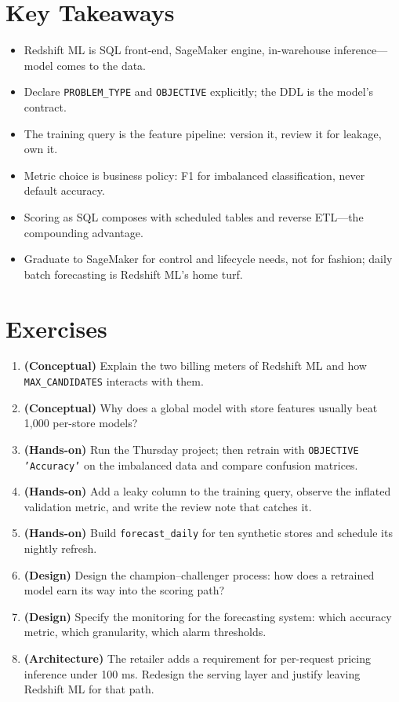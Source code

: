\section*{Key Takeaways}
\begin{itemize}
    \item Redshift ML is SQL front-end, SageMaker engine, in-warehouse inference---model comes to the data.
    \item Declare \texttt{PROBLEM\_TYPE} and \texttt{OBJECTIVE} explicitly; the DDL is the model's contract.
    \item The training query is the feature pipeline: version it, review it for leakage, own it.
    \item Metric choice is business policy: F1 for imbalanced classification, never default accuracy.
    \item Scoring as SQL composes with scheduled tables and reverse ETL---the compounding advantage.
    \item Graduate to SageMaker for control and lifecycle needs, not for fashion; daily batch forecasting is Redshift ML's home turf.
\end{itemize}

\section{Exercises}
\begin{enumerate}
    \item \textbf{(Conceptual)} Explain the two billing meters of Redshift ML and how \texttt{MAX\_CANDIDATES} interacts with them.
    \item \textbf{(Conceptual)} Why does a global model with store features usually beat 1,000 per-store models?
    \item \textbf{(Hands-on)} Run the Thursday project; then retrain with \texttt{OBJECTIVE 'Accuracy'} on the imbalanced data and compare confusion matrices.
    \item \textbf{(Hands-on)} Add a leaky column to the training query, observe the inflated validation metric, and write the review note that catches it.
    \item \textbf{(Hands-on)} Build \texttt{forecast\_daily} for ten synthetic stores and schedule its nightly refresh.
    \item \textbf{(Design)} Design the champion--challenger process: how does a retrained model earn its way into the scoring path?
    \item \textbf{(Design)} Specify the monitoring for the forecasting system: which accuracy metric, which granularity, which alarm thresholds.
    \item \textbf{(Architecture)} The retailer adds a requirement for per-request pricing inference under 100 ms. Redesign the serving layer and justify leaving Redshift ML for that path.
\end{enumerate}


